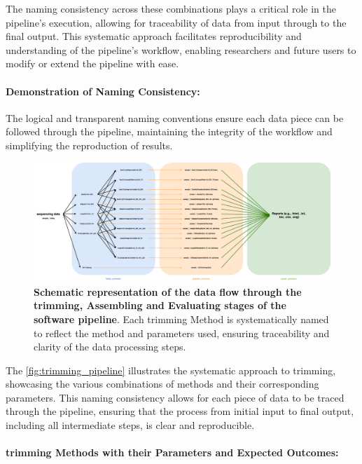 The naming consistency across these combinations plays a critical role in the pipeline's execution, allowing for traceability of data from input through to the final output. This systematic approach facilitates reproducibility and understanding of the pipeline's workflow, enabling researchers and future users to modify or extend the pipeline with ease.

\paragraph{Demonstration of Naming Consistency:}
The logical and transparent naming conventions ensure each data piece can be followed through the pipeline, maintaining the integrity of the workflow and simplifying the reproduction of results.

\begin{figure}[H]
    \centering
    \includegraphics[width=\textwidth]{resources/images/NGS-pipeline.drawio.png}
    \caption{\textbf{Schematic representation of the data flow through the \gls{trimming}, Assembling and Evaluating stages of the software pipeline}. Each \gls{trimming} Method is systematically named to reflect the method and parameters used, ensuring traceability and clarity of the data processing steps.}
    \label{fig:trimming_pipeline}
\end{figure}

The \autoref{fig:trimming_pipeline} illustrates the systematic approach to \gls{trimming}, showcasing the various combinations of methods and their corresponding parameters. This naming consistency allows for each piece of data to be traced through the pipeline, ensuring that the process from initial input to final output, including all intermediate steps, is clear and reproducible.

\paragraph{\gls{trimming} Methods with their Parameters and Expected Outcomes:}


